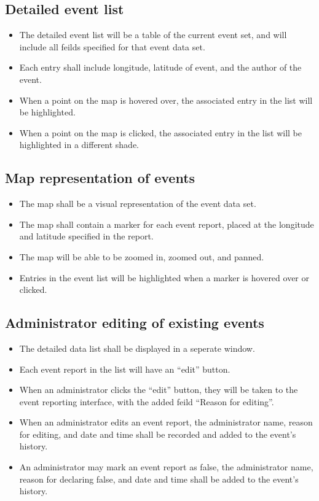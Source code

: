 \subsection{Detailed event list}
\begin{itemize}
\item The detailed event list will be a table of the current event set, and will include all feilds specified for that event data set.
\item Each entry shall include longitude, latitude of event, and the author of the event.
\item When a point on the map is hovered over, the associated entry in the list will be highlighted.
\item When a point on the map is clicked, the associated entry in the list will be highlighted in a different shade.
\end{itemize}

\subsection{Map representation of events}
\begin{itemize}
\item The map shall be a visual representation of the event data set. 
\item The map shall contain a marker for each event report, placed at the longitude and latitude specified in the report.
\item The map will be able to be zoomed in, zoomed out, and panned.
\item Entries in the event list will be highlighted when a marker is hovered over or clicked.
\end{itemize}

\subsection{Administrator editing of existing events}
\begin{itemize}
\item The detailed data list shall be displayed in a seperate window.
\item Each event report in the list will have an ``edit'' button.
\item When an administrator clicks the ``edit'' button, they will be taken to the event reporting interface, with the added feild ``Reason for editing''.
\item When an administrator edits an event report, the administrator name, reason for editing, and date and time shall be recorded and added to the event's history.
\item An administrator may mark an event report as false, the administrator name, reason for declaring false, and date and time shall be added to the event's history.
\end{itemize}

